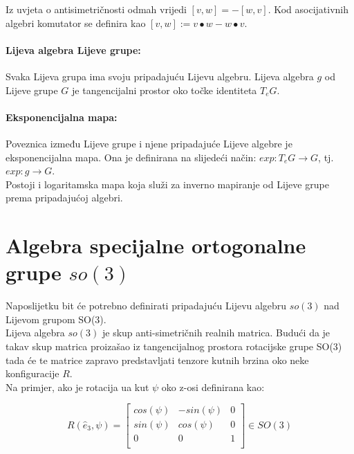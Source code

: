 \documentclass[times, utf8, diplomski]{fer}
\begin{document}
	Iz uvjeta o antisimetričnosti odmah vrijedi $[v,w]=-[w,v]$. Kod asocijativnih algebri komutator se definira kao $[v,w]:=v \bullet w - w \bullet v$.
	
	\paragraph{Lijeva algebra Lijeve grupe:} Svaka Lijeva grupa ima svoju pripadajuću Lijevu algebru. Lijeva algebra $g$ od Lijeve grupe $G$ je tangencijalni prostor oko točke identiteta $T_e G$.
	
	\paragraph{Eksponencijalna mapa:} Poveznica između Lijeve grupe i njene pripadajuće Lijeve algebre je eksponencijalna mapa. Ona je definirana na slijedeći način: $exp: T_eG \rightarrow	G$, tj. $exp: g \rightarrow G.$ \\ Postoji i logaritamska mapa koja služi za inverno mapiranje od Lijeve grupe prema pripadajućoj algebri.

\section{Algebra specijalne ortogonalne grupe $so(3)$}

	Naposlijetku bit će potrebno definirati pripadajuću Lijevu algebru $so(3)$ nad Lijevom grupom SO(3). \\
	Lijeva algebra $so(3)$ je skup anti-simetričnih realnih matrica. Budući da je takav skup matrica proizašao iz tangencijalnog prostora rotacijske grupe SO(3) tada će te matrice zapravo predstavljati tenzore kutnih brzina oko neke konfiguracije $R$. \\
	Na primjer, ako je rotacija ua kut $\psi$ oko z-osi definirana kao:
	
	\begin{equation}
		R( \hat{e}_3, \psi ) = 
		\begin{bmatrix}
			cos(\psi)	&	-sin(\psi)	&	0 \\
			sin(\psi)	&	cos(\psi)	&	0 \\
			0			&	0			&	1 \\	
		\end{bmatrix} \in SO(3)
	\end{equation}
	
	\newpage
	\clearpage
	
\end{document}
